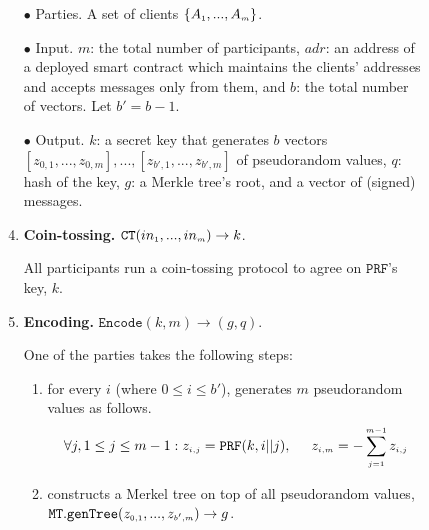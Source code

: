 



\begin{figure}[ht]%
\setlength{\fboxsep}{1pt}
\begin{center}
    \begin{tcolorbox}[enhanced,width=5.5in, 
    drop fuzzy shadow southwest,
    colframe=black,colback=white]


\small{

\begin{enumerate}
\item[$\bullet$]    {Parties.} A set of clients $\{    A_{\scriptscriptstyle 1},...,  A_{\scriptscriptstyle m}\}$.
%
\item[$\bullet$]    {Input.}  $m$: the total number of participants, $adr$: an address of a deployed smart contract which maintains the clients' addresses and accepts messages only from them, and $b$: the total number of vectors. Let $b'=b-1$. 
%
\item[$\bullet$]   {Output.}  $k$: a secret key that generates $b$ vectors $[z_{\scriptscriptstyle 0,1},...,z_{\scriptscriptstyle 0,m}],...,[z_{\scriptscriptstyle b',1},...,z_{\scriptscriptstyle b',m}]$ of pseudorandom values, $q$: hash of the key,  $g$: a Merkle tree's root, and a vector of (signed) messages. 




\item {\textbf{Coin-tossing.} $\mathtt{CT} (in_{\scriptscriptstyle 1},..., in_{\scriptscriptstyle m})\rightarrow k$}. 

All participants run a coin-tossing protocol to agree on $\mathtt{PRF}$'s key, $k$.
\item\label{ZSPA:val-gen}  {\textbf{Encoding.} $\mathtt{Encode}(k, m)\rightarrow (g,q)$}.

 One of the parties takes the following steps:  
\begin{enumerate}

\item for every $i$ (where $0\leq i \leq b'$), generates $m$ pseudorandom values as follows. 
%
 $$\forall j, 1\leq j \leq m-1: z_{\scriptscriptstyle i,j}=\mathtt{PRF}(k,i||j), \hspace{5mm} z_{\scriptscriptstyle i,m}=-\sum\limits^{\scriptscriptstyle m-1}_{\scriptscriptstyle j=1}z_{\scriptscriptstyle i,j}$$
%
\item   constructs a Merkel tree on top of all pseudorandom values,  $\mathtt{MT.genTree}(z_{\scriptscriptstyle 0,1},...,z_{\scriptscriptstyle b',m})\rightarrow g$. 


\end{enumerate}
\end{enumerate}}
\end{tcolorbox}
\end{center}
\end{figure}

